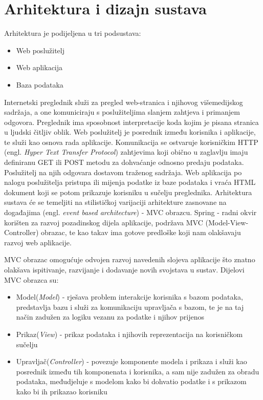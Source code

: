 \chapter{Arhitektura i dizajn sustava}		
Arhitektura je podijeljena u tri podsustava:

\begin{itemize}
	\item Web poslužitelj
	\item Web aplikacija
	\item Baza podataka
\end{itemize}

\indent Internetski preglednik služi za pregled web-stranica i njihovog višemedijskog sadržaja, a one komuniciraju s poslužiteljima slanjem zahtjeva i primanjem odgovora. Preglednik ima sposobnost interpretacije koda kojim je pisana stranica u ljudski čitljiv oblik.
\newline
\indent Web poslužitelj je posrednik između korisnika i aplikacije, te služi kao osnova rada aplikacije. Komunikacija se ostvaruje korisničkim HTTP (engl. \textit{Hyper Text Transfer Protocol}) zahtjevima koji obično u zaglavlju imaju definiranu GET ili POST metodu za dohvaćanje odnosno predaju podataka. Poslužitelj na njih odgovara dostavom traženog sadržaja.
\newline
\indent Web aplikacija po nalogu poslužitelja pristupa ili mijenja podatke iz baze podataka i vraća HTML dokument koji se potom prikazuje korisniku u sučelju preglednika. Arhitektura sustava će se temeljiti na stilističkoj varijaciji arhitekture zasnovane na događajima (engl. \textit{event based architecture}) - MVC obrazcu. Spring - radni okvir korišten za razvoj pozadinskog dijela aplikacije, podržava MVC (Model-View-Controller) obrazac, te kao takav ima gotove predloške koji nam olakšavaju razvoj web aplikacije.
\newline

\clearpage
\indent MVC obrazac omogućuje odvojen razvoj navedenih slojeva aplikacije što znatno olakšava ispitivanje, razvijanje i dodavanje novih svojstava u sustav.
\newline
Dijelovi MVC obrazca su:
\begin{itemize}
	\item Model(\textit{Model}) - rješava problem interakcije korisnika s bazom podataka, predstavlja bazu i služi za komunikaciju upravljača s bazom, te je na taj način zadužen za logiku vezanu za podatke i njihov prijenos
	\item Prikaz(\textit{View}) - prikaz podataka i njihovih reprezentacija na korisničkom sučelju
	\item Upravljač(\textit{Controller}) - povezuje komponente modela i prikaza i služi kao posrednik između tih komponenata i korisnika, a sam nije zadužen za obradu podataka, međudjeluje s modelom kako bi dohvatio podatke i s prikazom kako bi ih prikazao korisniku
\end{itemize}

